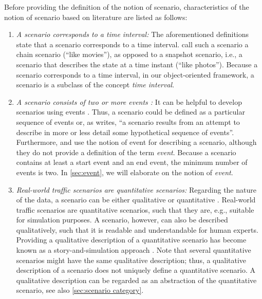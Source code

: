 Before providing the definition of the notion of scenario, characteristics of the notion of scenario based on literature are listed as follows:
\begin{enumerate}
	\item \textit{A scenario corresponds to a time interval:}
	The aforementioned definitions \autocite{go2004blind, geyer2014, ulbrich2015, elrofai2016scenario} state that a scenario corresponds to a time interval. \textcite{vannotten2003updated} call such a scenario a chain scenario (``like movies''), as opposed to a snapshot scenario, i.e., a scenario that describes the state at a time instant (``like photos''). %
	\cstartb Because a scenario corresponds to a time interval, in our object-oriented framework, a scenario is a subclass of the concept \emph{time interval}. \cendb

	\item \textit{A scenario consists of \cstartb two or more \cendb events \autocite{vannotten2003updated, go2004blind, geyer2014, ulbrich2015, kahn1962}:}
	It can be helpful to develop scenarios using events \autocite{bishop2007scentechniques}. Thus, a scenario could be defined as a particular sequence of events or, as \textcite[p.~143]{kahn1962} writes, ``a scenario results from an attempt to describe in more or less detail some hypothetical sequence of events''. Furthermore, \textcite{geyer2014} and \textcite{ulbrich2015} use the notion of event for describing a scenario, although they do not provide a definition of the term \emph{event}. 
	\cstartb Because a scenario contains at least a start event and an end event, the minimum number of events is two. \cendb
	In \cref{sec:event}, we will elaborate on the notion of \emph{event}.

	\item \textit{Real-world traffic scenarios are quantitative scenarios:}
	Regarding the nature of the data, a scenario can be either qualitative or quantitative \autocite{vannotten2003updated}. Real-world traffic scenarios are quantitative scenarios, such that they are, e.g., suitable for simulation purposes. A scenario, however, can also be described qualitatively, such that it is readable and understandable for human experts. Providing a qualitative description of a quantitative scenario has become known as a story-and-simulation approach \autocite{alcamo2001scenarios}. 
	Note that several quantitative scenarios might have the same qualitative description; thus, a qualitative description of a scenario does not uniquely define a quantitative scenario. A qualitative description can be regarded as an abstraction of the quantitative scenario, see also \cref{sec:scenario category}.


\end{enumerate}
